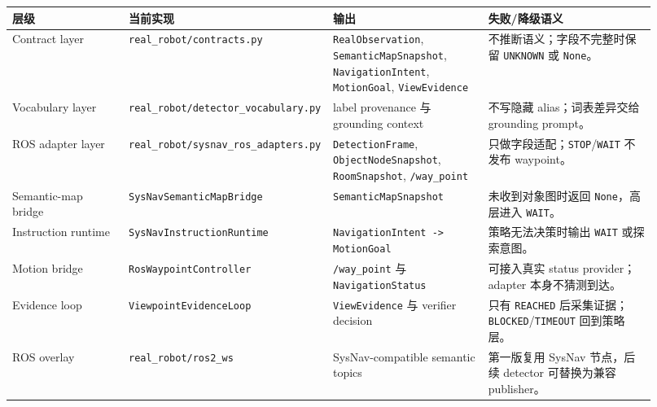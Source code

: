 \documentclass[UTF8,zihao=-4]{ctexart}
\begin{document}
\begin{longtable}{p{0.18\linewidth}p{0.24\linewidth}p{0.24\linewidth}p{0.26\linewidth}}
\toprule
\textbf{层级} & \textbf{当前实现} & \textbf{输出} & \textbf{失败/降级语义} \\
\midrule
Contract layer &
\texttt{real\_robot/contracts.py} &
\texttt{RealObservation}, \texttt{SemanticMapSnapshot}, \texttt{NavigationIntent},
\texttt{MotionGoal}, \texttt{ViewEvidence} &
不推断语义；字段不完整时保留 \texttt{UNKNOWN} 或 \texttt{None}。\\
Vocabulary layer &
\texttt{real\_robot/detector\_vocabulary.py} &
label provenance 与 grounding context &
不写隐藏 alias；词表差异交给 grounding prompt。\\
ROS adapter layer &
\texttt{real\_robot/sysnav\_ros\_adapters.py} &
\texttt{DetectionFrame}, \texttt{ObjectNodeSnapshot}, \texttt{RoomSnapshot},
\texttt{/way\_point} &
只做字段适配；\texttt{STOP}/\texttt{WAIT} 不发布 waypoint。\\
Semantic-map bridge &
\texttt{SysNavSemanticMapBridge} &
\texttt{SemanticMapSnapshot} &
未收到对象图时返回 \texttt{None}，高层进入 \texttt{WAIT}。\\
Instruction runtime &
\texttt{SysNavInstructionRuntime} &
\texttt{NavigationIntent -> MotionGoal} &
策略无法决策时输出 \texttt{WAIT} 或探索意图。\\
Motion bridge &
\texttt{RosWaypointController} &
\texttt{/way\_point} 与 \texttt{NavigationStatus} &
可接入真实 status provider；adapter 本身不猜测到达。\\
Evidence loop &
\texttt{ViewpointEvidenceLoop} &
\texttt{ViewEvidence} 与 verifier decision &
只有 \texttt{REACHED} 后采集证据；\texttt{BLOCKED}/\texttt{TIMEOUT} 回到策略层。\\
ROS overlay &
\texttt{real\_robot/ros2\_ws} &
SysNav-compatible semantic topics &
第一版复用 SysNav 节点，后续 detector 可替换为兼容 publisher。\\
\bottomrule
\end{longtable}
\end{document}
